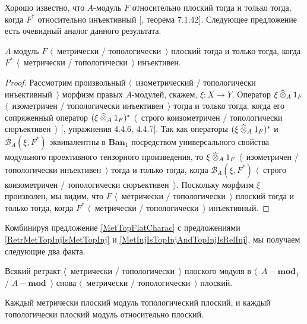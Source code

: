 Хорошо известно, что $A$-модуль $F$ относительно плоский тогда и только тогда, когда $F^*$ относительно инъективный [\cite{HelBanLocConvAlg}, теорема 7.1.42]. Следующее предложение есть очевидный аналог данного результата.

\begin{proposition}\label{MetTopFlatCharac} $A$-модуль $F$ $\langle$~метрически / топологически~$\rangle$ плоский тогда и только тогда, когда $F^*$ $\langle$~метрически / топологически~$\rangle$ инъективен.
\end{proposition}
\begin{proof} Рассмотрим произвольный $\langle$~изометрический / топологически инъективный~$\rangle$ морфизм правых $A$-модулей, скажем, $\xi:X\to Y$. Оператор $\xi\mathbin{\widehat{\otimes}}_{A} 1_F$ $\langle$~изометричен / топологически инъективен~$\rangle$ тогда и только тогда, когда его сопряженный оператор $(\xi\mathbin{\widehat{\otimes}}_{A} 1_F)^*$ $\langle$~строго коизометричен / топологически сюръективен~$\rangle$  [\cite{HelLectAndExOnFuncAn}, упражнения 4.4.6, 4.4.7]. Так как операторы $(\xi\mathbin{\widehat{\otimes}}_{A} 1_F)^*$ и $\mathcal{B}_A(\xi,F^*)$ эквивалентны в $\mathbf{Ban}_1$ посредством универсального свойства модульного проективного тензорного произведения, то $\xi\mathbin{\widehat{\otimes}}_{A} 1_F$ $\langle$~изометричен / топологически инъективен~$\rangle$ тогда и только тогда, когда $\mathcal{B}_A(\xi,F^*)$ $\langle$~строго коизометричен / топологически сюръективен~$\rangle$. Поскольку морфизм $\xi$ произволен, мы видим, что $F$  $\langle$~метрически / топологически~$\rangle$ плоский тогда и только тогда, когда $F^*$  $\langle$~метрически / топологически~$\rangle$ инъективный.
\end{proof}

Комбинируя предложение \ref{MetTopFlatCharac} с предложениями \ref{RetrMetTopInjIsMetTopInj} и \ref{MetInjIsTopInjAndTopInjIsRelInj}, мы получаем следующие два факта.

\begin{proposition}\label{RetrMetTopFlatIsMetTopFlat} Всякий ретракт $\langle$~метрически / топологически~$\rangle$ плоского модуля в $\langle$~$A-\mathbf{mod}_1$ / $A-\mathbf{mod}$~$\rangle$ снова $\langle$~метрически / топологически~$\rangle$ плоский.
\end{proposition}

\begin{proposition}\label{MetFlatIsTopFlatAndTopFlatIsRelFlat} Каждый метрически плоский модуль топологический плоский, и каждый топологически плоский модуль относительно плоский.
\end{proposition}

